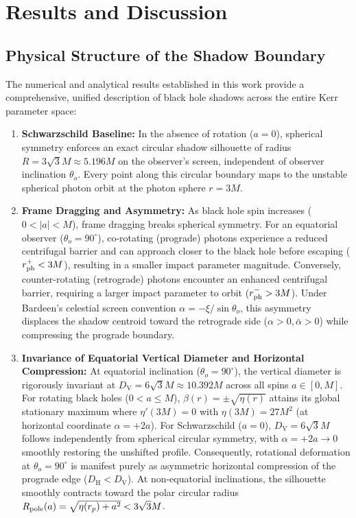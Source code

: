 \section{Results and Discussion}
\label{sec:results_discussion}

\subsection{Physical Structure of the Shadow Boundary}
The numerical and analytical results established in this work provide a comprehensive, unified description of black hole shadows across the entire Kerr parameter space:
\begin{enumerate}
    \item \textbf{Schwarzschild Baseline:} In the absence of rotation ($a = 0$), spherical symmetry enforces an exact circular shadow silhouette of radius $R = 3\sqrt{3}M \approx 5.196M$ on the observer's screen, independent of observer inclination $\theta_o$. Every point along this circular boundary maps to the unstable spherical photon orbit at the photon sphere $r = 3M$.
    \item \textbf{Frame Dragging and Asymmetry:} As black hole spin increases ($0 < |a| < M$), frame dragging breaks spherical symmetry. For an equatorial observer ($\theta_o = 90^\circ$), co-rotating (prograde) photons experience a reduced centrifugal barrier and can approach closer to the black hole before escaping ($r_{\rm ph}^+ < 3M$), resulting in a smaller impact parameter magnitude. Conversely, counter-rotating (retrograde) photons encounter an enhanced centrifugal barrier, requiring a larger impact parameter to orbit ($r_{\rm ph}^- > 3M$). Under Bardeen's celestial screen convention $\alpha = -\xi/\sin\theta_o$, this asymmetry displaces the shadow centroid toward the retrograde side ($\alpha > 0, \bar{\alpha} > 0$) while compressing the prograde boundary.
    \item \textbf{Invariance of Equatorial Vertical Diameter and Horizontal Compression:} At equatorial inclination ($\theta_o = 90^\circ$), the vertical diameter is rigorously invariant at $D_{\mathrm{V}} = 6\sqrt{3}M \approx 10.392M$ across all spins $a \in [0, M]$. For rotating black holes ($0 < a \le M$), $\beta(r) = \pm\sqrt{\eta(r)}$ attains its global stationary maximum where $\eta'(3M) = 0$ with $\eta(3M) = 27M^2$ (at horizontal coordinate $\alpha = +2a$). For Schwarzschild ($a = 0$), $D_{\mathrm{V}} = 6\sqrt{3}M$ follows independently from spherical circular symmetry, with $\alpha = +2a \to 0$ smoothly restoring the unshifted profile. Consequently, rotational deformation at $\theta_o = 90^\circ$ is manifest purely as asymmetric horizontal compression of the prograde edge ($D_{\mathrm{H}} < D_{\mathrm{V}}$). At non-equatorial inclinations, the silhouette smoothly contracts toward the polar circular radius $R_{\rm pole}(a) = \sqrt{\eta(r_p) + a^2} < 3\sqrt{3}M$.

\end{enumerate}
